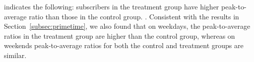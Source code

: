  indicates the following:
subscribers in the treatment group have higher peak-to-average ratio than
those in the control group. .  Consistent with the results in
Section~\ref{subsec:primetime}, we also found that on weekdays, the
peak-to-average ratios in the treatment group are higher than the control
group, whereas on weekends peak-to-average ratios for both the control and
treatment groups are similar. 